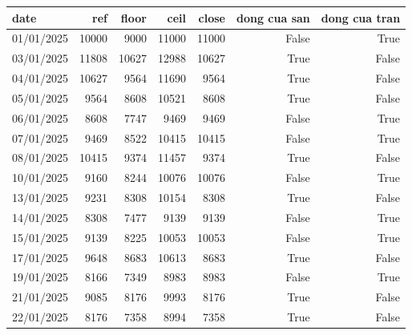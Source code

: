 \begin{tabular}{lrrrrrr}
\toprule
date & ref & floor & ceil & close & dong cua san & dong cua tran \\
\midrule
01/01/2025 & 10000 & 9000 & 11000 & 11000 & False & True \\
03/01/2025 & 11808 & 10627 & 12988 & 10627 & True & False \\
04/01/2025 & 10627 & 9564 & 11690 & 9564 & True & False \\
05/01/2025 & 9564 & 8608 & 10521 & 8608 & True & False \\
06/01/2025 & 8608 & 7747 & 9469 & 9469 & False & True \\
07/01/2025 & 9469 & 8522 & 10415 & 10415 & False & True \\
08/01/2025 & 10415 & 9374 & 11457 & 9374 & True & False \\
10/01/2025 & 9160 & 8244 & 10076 & 10076 & False & True \\
13/01/2025 & 9231 & 8308 & 10154 & 8308 & True & False \\
14/01/2025 & 8308 & 7477 & 9139 & 9139 & False & True \\
15/01/2025 & 9139 & 8225 & 10053 & 10053 & False & True \\
17/01/2025 & 9648 & 8683 & 10613 & 8683 & True & False \\
19/01/2025 & 8166 & 7349 & 8983 & 8983 & False & True \\
21/01/2025 & 9085 & 8176 & 9993 & 8176 & True & False \\
22/01/2025 & 8176 & 7358 & 8994 & 7358 & True & False \\
\bottomrule
\end{tabular}

